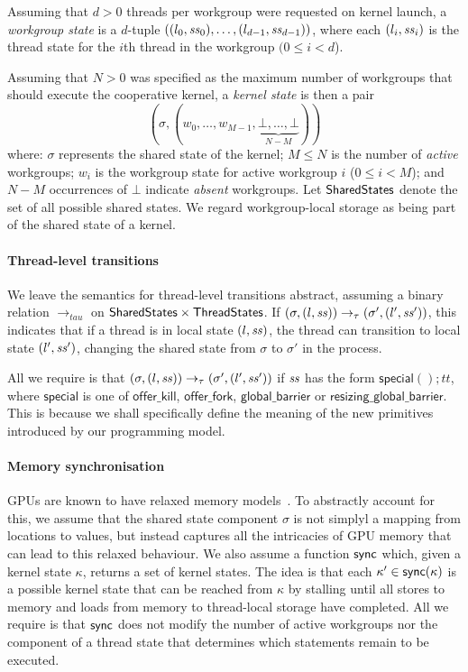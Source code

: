 \documentclass[numbers,nocopyrightspace,10pt]{sigplanconf}
\newcommand{\offerfork}{\mathsf{offer\_fork}}
\newcommand{\offerkill}{\mathsf{offer\_kill}}
\newcommand{\globalbarrier}{\mathsf{global\_barrier}}
\newcommand{\resizingglobalbarrier}{\mathsf{resizing\_global\_barrier}}
\begin{document}
Assuming that $d > 0$ threads per workgroup were requested on kernel launch, a \emph{workgroup state}
is a $d$-tuple $((l_0, \mathit{ss}_0), \dots, (l_{d-1}, \mathit{ss}_{d-1}))$, where each $(l_i, \mathit{ss}_i)$ is the thread state for the $i$th thread in the workgroup $(0\leq i < d$).

Assuming that $N > 0$ was specified as the maximum number of
workgroups that should execute the cooperative kernel, a \emph{kernel
  state} is then a pair
%
\[
(\sigma, (w_0, \dots, w_{M-1}, \underbrace{\bot, \dots,
\bot}_{N-M}))\]
%
where: $\sigma$ represents the shared state of the kernel; $M \leq N$
is the number of \emph{active} workgroups; $w_i$ is the workgroup
state for active workgroup $i$ ($0 \leq i < M$); and $N-M$ occurrences
of $\bot$ indicate \emph{absent} workgroups.  Let $\mathsf{SharedStates}$
denote the set of all possible shared states.  We regard
workgroup-local storage as being part of the shared state of a kernel.

\paragraph{Thread-level transitions}

We leave the semantics for thread-level transitions abstract, assuming
a binary relation $\rightarrow_{tau}$ on $\mathsf{SharedStates}{} \times
\mathsf{ThreadStates}{}$.  If $(\sigma, (l, \mathit{ss})) \rightarrow_{\tau}
(\sigma', (l', \mathit{ss}'))$, this indicates that if a thread is in local
state $(l, \mathit{ss})$, the thread can transition to local state $(l',
\mathit{ss}')$, changing the shared state from $\sigma$ to $\sigma'$ in the
process.

All we require is that $(\sigma, (l, \mathit{ss})) \rightarrow_{\tau}
(\sigma', (l', \mathit{ss}'))$ if $\mathit{ss}$ has the form $\mathsf{special}();
\mathit{tt}$, where $\mathsf{special}$ is one of $\offerkill$,
$\offerfork$, $\globalbarrier$ or $\resizingglobalbarrier$.  This is
because we shall specifically define the meaning of the new primitives
introduced by our programming model.

\paragraph{Memory synchronisation}

GPUs are known to have relaxed memory models~\cite{ABDGKPSW-2015}.  To abstractly
account for this, we assume that the shared state component $\sigma$
is not simplyl a mapping from locations to values, but instead
captures all the intricacies of GPU memory that can lead to this
relaxed behaviour.  We also assume a function $\mathsf{sync}$ which, given a
kernel state $\kappa$, returns a set of kernel states.  The idea is
that each $\kappa' \in \mathsf{sync}(\kappa)$ is a possible kernel state that
can be reached from $\kappa$ by stalling until all stores to memory
and loads from memory to thread-local storage have completed.  All we
require is that $\mathsf{sync}$ does not modify the number of active
workgroups nor the component of a thread state that determines which
statements remain to be executed.
\end{document}
